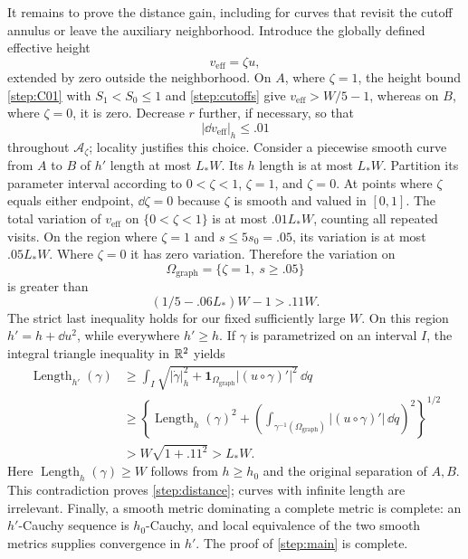 It remains to prove the distance gain, including for curves that revisit
the cutoff annulus or leave the auxiliary neighborhood.  Introduce the
globally defined effective height
\[
 v_{\mathrm{eff}}=\zeta u,
\]
extended by zero outside the neighborhood.  On $A$, where $\zeta=1$, the height
bound \eqref{step:C01} with $S_1<S_0\le1$ and \cref{step:cutoffs} give
$v_{\mathrm{eff}}>W/5-1$, whereas on $B$, where $\zeta=0$, it is zero.  Decrease $r$ further, if necessary, so that
\begin{equation}\label{step:height-cutoff}
 |\dd v_{\mathrm{eff}}|_h\le .01
\end{equation}
throughout $\mathcal A_\zeta$; locality justifies this choice.
Consider a piecewise smooth curve from $A$ to $B$ of $h'$ length at most
$L_*W$.  Its $h$ length is at most $L_*W$.  Partition its parameter interval according to $0<\zeta<1$,
$\zeta=1$, and $\zeta=0$. At points where $\zeta$ equals either endpoint,
$\dd\zeta=0$ because $\zeta$ is smooth and valued in $[0,1]$.
The total variation of
$v_{\mathrm{eff}}$ on $\{0<\zeta<1\}$ is at most $.01L_*W$,
counting all repeated visits.  On the region where $\zeta=1$ and
$s\le5s_0=.05$, its variation is at most $.05L_*W$.  Where $\zeta=0$
it has zero variation.  Therefore the variation on
\[
 \Omega_{\mathrm{graph}}=\{\zeta=1,\ s\ge .05\}
\]
is greater than
\[
 (1/5-.06L_*)W-1>.11W.
\]
The strict last inequality holds for our fixed sufficiently large $W$.
On this region $h'=h+\dd u^2$, while everywhere $h'\ge h$.
If $\gamma$ is parametrized on an interval $I$, the integral triangle
inequality in $\mathbb R^2$ yields
\begin{align*}
 \operatorname{Length}_{h'}(\gamma)
 &\ge\int_I\sqrt{|\dot\gamma|_h^2+
      \mathbf1_{\Omega_{\mathrm{graph}}}|(u\circ\gamma)'|^2}
       \,\dd q\\
 &\ge\left\{
   \operatorname{Length}_h(\gamma)^2+
   \left(\int_{\gamma^{-1}(\Omega_{\mathrm{graph}})}
     |(u\circ\gamma)'|\,\dd q\right)^2
   \right\}^{1/2}\\
 &>W\sqrt{1+.11^2}>L_*W.
\end{align*}
Here $\operatorname{Length}_h(\gamma)\ge W$ follows from $h\ge h_0$
and the original separation of $A,B$.  This contradiction proves
\cref{step:distance}; curves with infinite length are irrelevant.
Finally, a smooth metric dominating a complete metric is complete:
an $h'$-Cauchy sequence is $h_0$-Cauchy, and local equivalence of the
two smooth metrics supplies convergence in $h'$.  The proof of
\cref{step:main} is complete.
